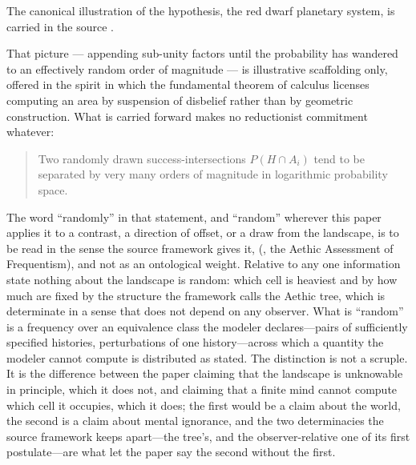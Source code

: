 \documentclass[11pt]{article}
\theoremstyle{definition}
\begin{document}
The canonical illustration of the hypothesis, the red dwarf planetary system, is carried in the source \cite{Nexus}.



That picture --- appending sub-unity factors until the probability has wandered to an effectively random order of magnitude --- is illustrative scaffolding only, offered in the spirit in which the fundamental theorem of calculus licenses computing an area by suspension of disbelief rather than by geometric construction. What is carried forward makes no reductionist commitment whatever:

\begin{quote}
Two randomly drawn success-intersections $P(H \cap A_i)$ tend to be separated by very many orders of magnitude in logarithmic probability space.
\end{quote}
The word ``randomly'' in that statement, and ``random'' wherever this paper applies it to a contrast, a direction of offset, or a draw from the landscape, is to be read in the sense the source framework gives it, (\cite{Aethus}, the Aethic Assessment of Frequentism), and not as an ontological weight. Relative to any one information state nothing about the landscape is random: which cell is heaviest and by how much are fixed by the structure the framework calls the Aethic tree, which is determinate in a sense that does not depend on any observer. What is ``random'' is a frequency over an equivalence class the modeler declares---pairs of sufficiently specified histories, perturbations of one history---across which a quantity the modeler cannot compute is distributed as stated. The distinction is not a scruple. It is the difference between the paper claiming that the landscape is unknowable in principle, which it does not, and claiming that a finite mind cannot compute which cell it occupies, which it does; the first would be a claim about the world, the second is a claim about mental ignorance, and the two determinacies the source framework keeps apart---the tree's, and the observer-relative one of its first postulate---are what let the paper say the second without the first.
\end{document}
